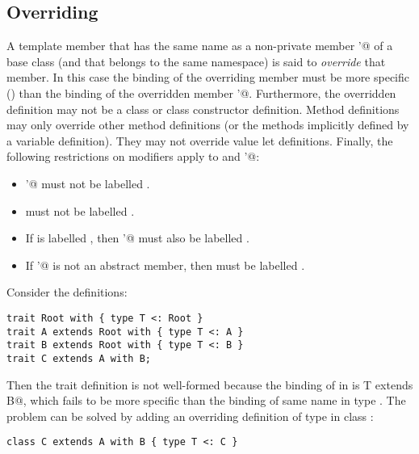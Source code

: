 \documentclass[11pt]{report}
\newcommand{\ifqualified}[1]{}
\begin{document}
\ifqualified{
\example\label{ex:compound-b}
Consider the definitions:
\begin{verbatim}
qualified class Root extends Any with { def r1: Root, r2: Int }
qualified class A extends Root with { def r1: A, a: String }
qualified class B extends A with { def r1: B, b: Double }
\end{verbatim}
Then \verb@A with B@ has members
\verb@Root::r1@ of type \verb@B@, \verb@Root::r2@ of type \verb@Int@,
\verb@A::a:@ of type \verb@String@, and \verb@B::b@ of type \verb@Double@,
in addition to the members inherited from class \verb@Any@.
}

\subsection{Overriding}
\label{sec:overriding}

A template member
\verb@M@ that has the same \ifqualified{qualified} 
name as a non-private member \verb@M'@
of a base class (and that belongs to the same namespace) is said to
{\em override} that member.  In this case the binding of the
overriding member
\verb@M@ must be more specific () than the 
binding of the overridden member \verb@M'@.
Furthermore, the overridden definition may not be a class or class
constructor definition.  Method definitions may only override other
method definitions (or the methods implicitly defined by a variable
definition). They may not override value let definitions.  Finally,
the following restrictions on modifiers apply to
\verb@M@ and \verb@M'@:
\begin{itemize}
\item
\verb@M'@ must not be labelled \verb@final@.
\item
\verb@M@ must not be labelled \verb@private@.
\item
If \verb@M@ is labelled \verb@protected@, then \verb@M'@ must also be
labelled \verb@protected@.
\item
If \verb@M'@ is not an abstract member, then
\verb@M@ must be labelled \verb@override@.
\end{itemize}

\example\label{ex:compound-a}
Consider the definitions:
\begin{verbatim}
trait Root with { type T <: Root }
trait A extends Root with { type T <: A }
trait B extends Root with { type T <: B }
trait C extends A with B;
\end{verbatim}
Then the trait definition \verb@C@ is not well-formed because the
binding of \verb@T@ in \verb@C@ is
\verb@type T extends B@,
which fails to be more specific than the binding of same name in type
\verb@A@. The problem can be solved by adding an overriding 
definition of type \verb@T@ in class \verb@C@:
\begin{verbatim}
class C extends A with B { type T <: C }
\end{verbatim}
\end{document}
